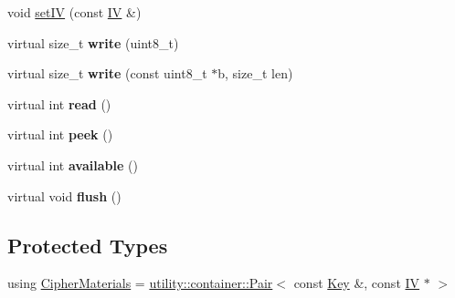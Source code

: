 \begin{DoxyCompactItemize}
\item 
void \mbox{\hyperlink{classathome_1_1arduino_1_1_a_encrypted_stream_a410aec7c93eaa6fd440e8c8bd47606f7}{set\+IV}} (const \mbox{\hyperlink{classathome_1_1arduino_1_1_a_encrypted_stream_a4a0c027bc7503bb0da538d6a2f0657e6}{IV}} \&)
\item 
\mbox{\label{classathome_1_1arduino_1_1_a_encrypted_stream_ac02e46c8e42d16b5fe61518d359b6a40}} 
virtual size\+\_\+t {\bfseries write} (uint8\+\_\+t)
\item 
\mbox{\label{classathome_1_1arduino_1_1_a_encrypted_stream_a8a3b8ec57e784eb10db884de0f4146bd}} 
virtual size\+\_\+t {\bfseries write} (const uint8\+\_\+t $\ast$b, size\+\_\+t len)
\item 
\mbox{\label{classathome_1_1arduino_1_1_a_encrypted_stream_acfd3ace70f548a22d11ec4832f6ed513}} 
virtual int {\bfseries read} ()
\item 
\mbox{\label{classathome_1_1arduino_1_1_a_encrypted_stream_a9b9e3f17ad44c40d7d1e22eeeb593bba}} 
virtual int {\bfseries peek} ()
\item 
\mbox{\label{classathome_1_1arduino_1_1_a_encrypted_stream_af01ec5ddb8c441f225991ebb5f068f75}} 
virtual int {\bfseries available} ()
\item 
\mbox{\label{classathome_1_1arduino_1_1_a_encrypted_stream_aca9a8b9150aff187525d5753e56ba5c4}} 
virtual void {\bfseries flush} ()
\end{DoxyCompactItemize}
\subsection*{Protected Types}
\begin{DoxyCompactItemize}
\item 
using \mbox{\hyperlink{classathome_1_1arduino_1_1_a_encrypted_stream_a67d68ce9b0daa19296b38c9bb3a5aee7}{Cipher\+Materials}} = \mbox{\hyperlink{classathome_1_1utility_1_1container_1_1_pair}{utility\+::container\+::\+Pair}}$<$ const \mbox{\hyperlink{classathome_1_1arduino_1_1_a_encrypted_stream_a2f0fd4a9c2a74a4ae857a4447aa3956f}{Key}} \&, const \mbox{\hyperlink{classathome_1_1arduino_1_1_a_encrypted_stream_a4a0c027bc7503bb0da538d6a2f0657e6}{IV}} $\ast$ $>$
\end{DoxyCompactItemize}
